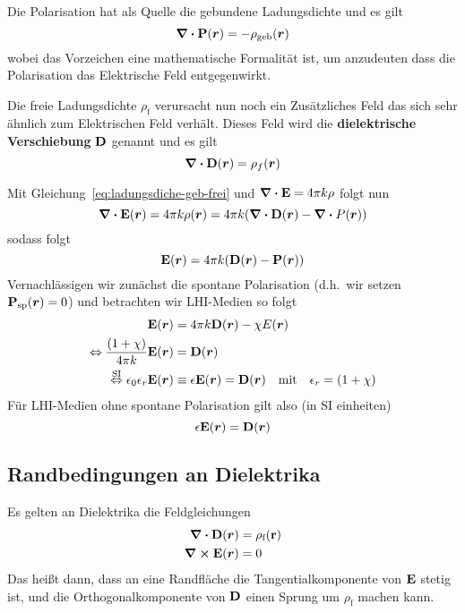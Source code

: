 Die Polarisation hat als Quelle die gebundene Ladungsdichte und es gilt
\begin{equation}
  \div \vb P(\vb*r) = -\rho_\text{geb}(\vb*r)
\end{equation}
wobei das Vorzeichen eine mathematische Formalität ist, um anzudeuten dass
die Polarisation das Elektrische Feld entgegenwirkt.

Die freie Ladungsdichte $\rho_\text{f}$ verursacht nun noch ein Zusätzliches
Feld das sich sehr ähnlich zum Elektrischen Feld verhält. Dieses Feld
wird die \textbf{dielektrische Verschiebung} $\vb D$ genannt und es gilt
\begin{equation}
  \div \vb D(\vb*r) = \rho_f(\vb*r)
\end{equation}

Mit Gleichung~\ref{eq:ladungsdiche-geb-frei} und $\div\vb E=4\pi k \rho$
folgt nun
\begin{equation*}
  \div \vb E(\vb*r) = 4\pi k \rho(\vb*r)=4\pi k(\div\vb D(\vb*r)-\div P(\vb*r))
\end{equation*}
sodass folgt
\begin{equation}
  \vb E(\vb*r) = 4\pi k (\vb D(\vb*r) - \vb P(\vb*r))
\end{equation}
Vernachlässigen wir zunächst die spontane Polarisation (d.h.\ wir setzen  
$\vb P_\text{sp}(\vb*r)=0$) und betrachten wir LHI-Medien so folgt
\begin{equation}
  \begin{split}
    \vb E(\vb*r) 
    &= 4\pi k \vb D(\vb*r) - \chi E(\vb*r)\\
    \Leftrightarrow \frac{(1+\chi)}{4\pi k} \vb E(\vb*r) 
    &= \vb D(\vb*r)\\
    \stackrel{\text{SI}}{\Leftrightarrow} 
    \vb \epsilon_0\epsilon_r \vb E(\vb*r) 
    &\equiv 
    \epsilon \vb E(\vb*r)
    = \vb D(\vb*r) \quad \text{mit}\quad \epsilon_r = (1+\chi) \\
  \end{split}
\end{equation}
Für LHI-Medien ohne spontane Polarisation gilt also (in SI einheiten)
\begin{equation*}
  \epsilon \vb E(\vb*r) = \vb D(\vb*r) 
\end{equation*}

\subsection{Randbedingungen an Dielektrika}%
\label{sub:randbedingungen-an-dielektrika}
Es gelten an Dielektrika die Feldgleichungen
\begin{equation}
  \begin{split}
    \div \vb D(\vb*r) &= \rho_\text{f}(\vb r)\\
    \curl \vb E(\vb*r) &= 0\\
  \end{split}
\end{equation}
Das heißt dann, dass an eine Randfläche die 
Tangentialkomponente von $\vb E$ stetig ist, und
die Orthogonalkomponente von $\vb D$ einen Sprung um $\rho_\text{f}$ 
machen kann.
